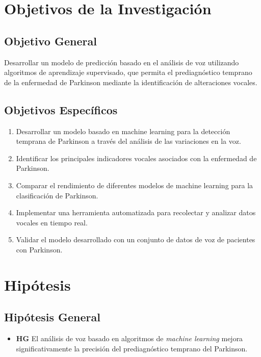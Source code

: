 \documentclass[listof=nochaptergap,12pt,times,authoryear]{report}
\begin{document}
\section{Objetivos de la Investigación}

\subsection{Objetivo General}
Desarrollar un modelo de predicción basado en el análisis de voz utilizando algoritmos de aprendizaje supervisado, que permita el prediagnóstico temprano de la enfermedad de Parkinson mediante la identificación de alteraciones vocales.

\subsection{Objetivos Específicos}
\begin{enumerate}
    \item Desarrollar un modelo basado en machine learning para la detección temprana de Parkinson a través del análisis de las variaciones en la voz.
    \item Identificar los principales indicadores vocales asociados con la enfermedad de Parkinson.
    \item Comparar el rendimiento de diferentes modelos de machine learning para la clasificación de Parkinson.
    \item Implementar una herramienta automatizada para recolectar y analizar datos vocales en tiempo real.
    \item Validar el modelo desarrollado con un conjunto de datos de voz de pacientes con Parkinson.
\end{enumerate}
\section{Hipótesis}
\subsection{Hipótesis General}
\begin{itemize}
    \item \textbf{HG} El análisis de voz basado en algoritmos de \textit{machine learning} mejora significativamente la precisión del prediagnóstico temprano del Parkinson.
\end{itemize}    
\end{document}
